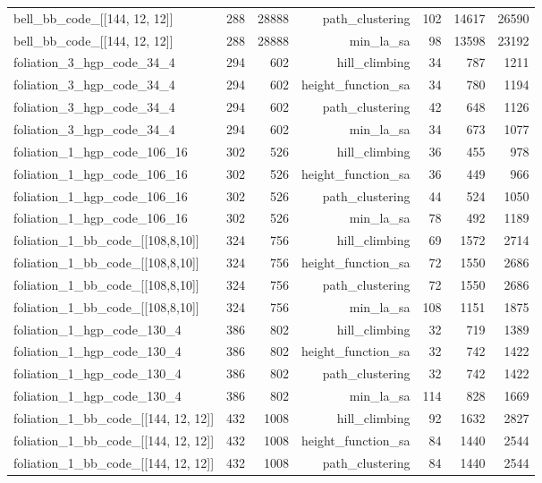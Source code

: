 \begin{longtable}{lrrrrrr}
  bell\_bb\_code\_[[144, 12, 12]] & 288 & 28888 & path\_clustering & 102 & 14617 & 26590 \\
  bell\_bb\_code\_[[144, 12, 12]] & 288 & 28888 & min\_la\_sa & 98 & 13598 & 23192 \\
  foliation\_3\_hgp\_code\_34\_4 & 294 & 602 & hill\_climbing & 34 & 787 & 1211 \\
  foliation\_3\_hgp\_code\_34\_4 & 294 & 602 & height\_function\_sa & 34 & 780 & 1194 \\
  foliation\_3\_hgp\_code\_34\_4 & 294 & 602 & path\_clustering & 42 & 648 & 1126 \\
  foliation\_3\_hgp\_code\_34\_4 & 294 & 602 & min\_la\_sa & 34 & 673 & 1077 \\
  foliation\_1\_hgp\_code\_106\_16 & 302 & 526 & hill\_climbing & 36 & 455 & 978 \\
  foliation\_1\_hgp\_code\_106\_16 & 302 & 526 & height\_function\_sa & 36 & 449 & 966 \\
  foliation\_1\_hgp\_code\_106\_16 & 302 & 526 & path\_clustering & 44 & 524 & 1050 \\
  foliation\_1\_hgp\_code\_106\_16 & 302 & 526 & min\_la\_sa & 78 & 492 & 1189 \\
  foliation\_1\_bb\_code\_[[108,8,10]] & 324 & 756 & hill\_climbing & 69 & 1572 & 2714 \\
  foliation\_1\_bb\_code\_[[108,8,10]] & 324 & 756 & height\_function\_sa & 72 & 1550 & 2686 \\
  foliation\_1\_bb\_code\_[[108,8,10]] & 324 & 756 & path\_clustering & 72 & 1550 & 2686 \\
  foliation\_1\_bb\_code\_[[108,8,10]] & 324 & 756 & min\_la\_sa & 108 & 1151 & 1875 \\
  foliation\_1\_hgp\_code\_130\_4 & 386 & 802 & hill\_climbing & 32 & 719 & 1389 \\
  foliation\_1\_hgp\_code\_130\_4 & 386 & 802 & height\_function\_sa & 32 & 742 & 1422 \\
  foliation\_1\_hgp\_code\_130\_4 & 386 & 802 & path\_clustering & 32 & 742 & 1422 \\
  foliation\_1\_hgp\_code\_130\_4 & 386 & 802 & min\_la\_sa & 114 & 828 & 1669 \\
  foliation\_1\_bb\_code\_[[144, 12, 12]] & 432 & 1008 & hill\_climbing & 92 & 1632 & 2827 \\
  foliation\_1\_bb\_code\_[[144, 12, 12]] & 432 & 1008 & height\_function\_sa & 84 & 1440 & 2544 \\
  foliation\_1\_bb\_code\_[[144, 12, 12]] & 432 & 1008 & path\_clustering & 84 & 1440 & 2544 \\

\end{longtable}
